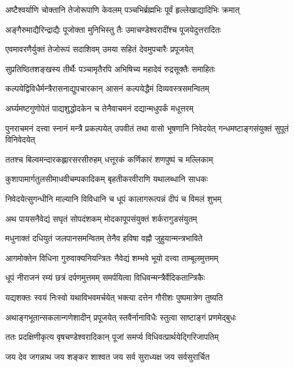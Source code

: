 \begin{center}
\twolineshloka
{अष्टैश्वर्याणि चोक्तानि तेजोरूपाणि केवलम्}
{पञ्चभिर्ब्रह्मभिः पूर्वं हृल्लेखाद्यादिभिः क्रमात्} %

\twolineshloka
{अङ्गैरुमाद्यैरिन्द्राद्यैः पूजोक्ता मुनिभिस्तु तैः}
{उमाचण्डेश्वरादींश्च पूजयेदुत्तरादितः} %

\twolineshloka
{एवमावरणैर्युक्तं तेजोरूपं सदाशिवम्}
{उमया सहितं देवमुपचारैः प्रपूजयेत्} %

\twolineshloka
{सुप्रतिष्ठितशङ्खस्य तीर्थैः पञ्चामृतैरपि}
{अभिषिच्य महादेवं रुद्रसूक्तैः समाहितः} %

\twolineshloka
{कल्पयेद्विविधैर्मन्त्रैरासनाद्युपचारकान्}
{आसनं कल्पयेद्धैमं दिव्यवस्त्रसमन्वितम्} %

\twolineshloka
{अर्घ्यमष्टगुणोपेतं पाद्यशुद्धोदकेन च}
{तेनैवाचमनं दद्यान्मधुपर्कं मधूत्तरम्} %

\threelineshloka
{पुनराचमनं दत्त्वा स्नानं मन्त्रै प्रकल्पयेत्}
{उपवीतं तथा वासो भूषणानि निवेदयेत्}
{गन्धमष्टाङ्गसंयुक्तं सुपूतं विनिवेदयेत्} %

\twolineshloka
{ततश्च बिल्वमन्दारकह्लारसरसीरुहम्}
{धत्तूरकं कर्णिकारं शणपुष्पं च मल्लिकाम्} %

\twolineshloka
{कुशापामार्गतुलसीमाधवीचम्पकादिकम्}
{बृहतीकरवीराणि यथालब्धानि साधकः} %

\twolineshloka
{निवेदयेत्सुगन्धीनि माल्यानि विविधानि च}
{धूपं कालागरूत्पन्नं दीपं च विमलं शुभम्} %

\twolineshloka
{अथ पायसनैवेद्यं सघृतं सोपदंशकम्}
{मोदकापूपसंयुक्तं शर्करागुडसंयुतम्} %

\twolineshloka
{मधुनाक्तं दधियुतं जलपानसमन्वितम्}
{तेनैव हविषा वह्नौ जुहुयान्मन्त्रभाविते} %

\twolineshloka
{आगमोक्तेन विधिना गुरुवाक्यनियन्त्रितः}
{नैवेद्यं शम्भवे भूयो दत्त्वा ताम्बूलमुत्तमम्} %

\twolineshloka
{धूपं नीराजनं रम्यं छत्रं दर्पणमुत्तमम्}
{समर्पयित्वा विधिवन्मन्त्रैर्वेदिकतान्त्रिकैः} %

\twolineshloka
{यद्यशक्तः स्वयं निःस्वो यथाविभवमर्चयेत्}
{भक्त्या दत्तेन गौरीशः पुष्पमात्रेण तुष्यति} %

\twolineshloka
{अथाङ्गभूतान्सकलान्गणेशादीन् प्रपूजयेत्}
{स्तवैर्नानाविधैः स्तुत्वा साष्टाङ्गं प्रणमेद्बुधः} %

\twolineshloka
{ततः प्रदक्षिणीकृत्य वृषचण्डेश्वरादिकान्}
{पूजां समर्प्य विधिवत्प्रार्थयेद्गिरिजापतिम्} %

\twolineshloka
{जय देव जगन्नाथ जय शङ्कर शाश्वत}
{जय सर्व सुराध्यक्ष जय सर्वसुरार्चित} %


\end{center}
